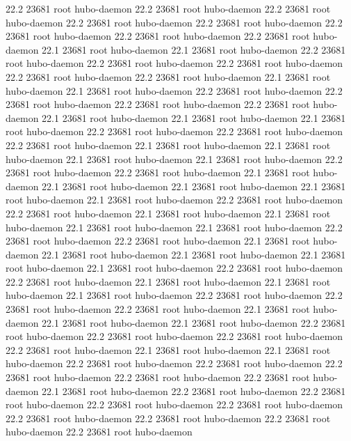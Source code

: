 22.2 23681 root     hubo-daemon
22.2 23681 root     hubo-daemon
22.2 23681 root     hubo-daemon
22.2 23681 root     hubo-daemon
22.2 23681 root     hubo-daemon
22.2 23681 root     hubo-daemon
22.2 23681 root     hubo-daemon
22.2 23681 root     hubo-daemon
22.1 23681 root     hubo-daemon
22.1 23681 root     hubo-daemon
22.2 23681 root     hubo-daemon
22.2 23681 root     hubo-daemon
22.2 23681 root     hubo-daemon
22.2 23681 root     hubo-daemon
22.2 23681 root     hubo-daemon
22.1 23681 root     hubo-daemon
22.1 23681 root     hubo-daemon
22.2 23681 root     hubo-daemon
22.2 23681 root     hubo-daemon
22.2 23681 root     hubo-daemon
22.2 23681 root     hubo-daemon
22.1 23681 root     hubo-daemon
22.1 23681 root     hubo-daemon
22.1 23681 root     hubo-daemon
22.2 23681 root     hubo-daemon
22.2 23681 root     hubo-daemon
22.2 23681 root     hubo-daemon
22.1 23681 root     hubo-daemon
22.1 23681 root     hubo-daemon
22.1 23681 root     hubo-daemon
22.1 23681 root     hubo-daemon
22.2 23681 root     hubo-daemon
22.2 23681 root     hubo-daemon
22.1 23681 root     hubo-daemon
22.1 23681 root     hubo-daemon
22.1 23681 root     hubo-daemon
22.1 23681 root     hubo-daemon
22.1 23681 root     hubo-daemon
22.2 23681 root     hubo-daemon
22.2 23681 root     hubo-daemon
22.1 23681 root     hubo-daemon
22.1 23681 root     hubo-daemon
22.1 23681 root     hubo-daemon
22.1 23681 root     hubo-daemon
22.2 23681 root     hubo-daemon
22.2 23681 root     hubo-daemon
22.1 23681 root     hubo-daemon
22.1 23681 root     hubo-daemon
22.1 23681 root     hubo-daemon
22.1 23681 root     hubo-daemon
22.1 23681 root     hubo-daemon
22.2 23681 root     hubo-daemon
22.2 23681 root     hubo-daemon
22.1 23681 root     hubo-daemon
22.1 23681 root     hubo-daemon
22.1 23681 root     hubo-daemon
22.2 23681 root     hubo-daemon
22.2 23681 root     hubo-daemon
22.2 23681 root     hubo-daemon
22.1 23681 root     hubo-daemon
22.1 23681 root     hubo-daemon
22.1 23681 root     hubo-daemon
22.2 23681 root     hubo-daemon
22.2 23681 root     hubo-daemon
22.2 23681 root     hubo-daemon
22.2 23681 root     hubo-daemon
22.1 23681 root     hubo-daemon
22.1 23681 root     hubo-daemon
22.2 23681 root     hubo-daemon
22.2 23681 root     hubo-daemon
22.2 23681 root     hubo-daemon
22.2 23681 root     hubo-daemon
22.2 23681 root     hubo-daemon
22.1 23681 root     hubo-daemon
22.2 23681 root     hubo-daemon
22.2 23681 root     hubo-daemon
22.2 23681 root     hubo-daemon
22.2 23681 root     hubo-daemon
22.2 23681 root     hubo-daemon
22.2 23681 root     hubo-daemon
22.2 23681 root     hubo-daemon
22.2 23681 root     hubo-daemon
